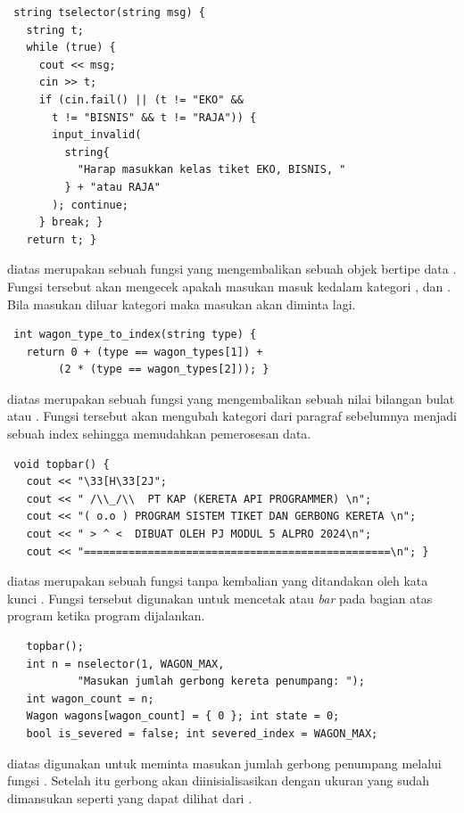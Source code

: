 \documentclass[../main.tex]{subfiles}
\begin{document}
\begin{lstlisting}
 string tselector(string msg) {
   string t;
   while (true) {
     cout << msg;
     cin >> t; 
     if (cin.fail() || (t != "EKO" &&
       t != "BISNIS" && t != "RAJA")) {
       input_invalid(
         string{
           "Harap masukkan kelas tiket EKO, BISNIS, "
         } + "atau RAJA"
       ); continue;
     } break; }
   return t; }
\end{lstlisting}
    \ilz{}{\Script} diatas merupakan sebuah fungsi yang mengembalikan sebuah objek bertipe data . Fungsi tersebut akan mengecek apakah masukan masuk kedalam kategori ,  dan . Bila masukan diluar kategori maka masukan akan diminta lagi.

\begin{lstlisting}
 int wagon_type_to_index(string type) {
   return 0 + (type == wagon_types[1]) +
        (2 * (type == wagon_types[2])); }
\end{lstlisting}
    \ilz{}{\Script} diatas merupakan sebuah fungsi yang mengembalikan sebuah nilai bilangan bulat atau . Fungsi tersebut akan mengubah kategori dari paragraf sebelumnya menjadi sebuah index sehingga memudahkan pemerosesan data.

\begin{lstlisting}
 void topbar() {
   cout << "\33[H\33[2J";
   cout << " /\\_/\\  PT KAP (KERETA API PROGRAMMER) \n";
   cout << "( o.o ) PROGRAM SISTEM TIKET DAN GERBONG KERETA \n";
   cout << " > ^ <  DIBUAT OLEH PJ MODUL 5 ALPRO 2024\n";
   cout << "================================================\n"; }
\end{lstlisting}
    \ilz{}{\Script} diatas merupakan sebuah fungsi tanpa kembalian yang ditandakan oleh kata kunci . Fungsi tersebut digunakan untuk mencetak {\header} atau \textit{bar} pada bagian atas program ketika program dijalankan.

\begin{lstlisting}
   topbar();
   int n = nselector(1, WAGON_MAX,
           "Masukan jumlah gerbong kereta penumpang: ");
   int wagon_count = n;
   Wagon wagons[wagon_count] = { 0 }; int state = 0;
   bool is_severed = false; int severed_index = WAGON_MAX;
\end{lstlisting}
    \ilz{}{\Script} diatas digunakan untuk meminta masukan jumlah gerbong penumpang melalui fungsi . Setelah itu gerbong akan diinisialisasikan dengan ukuran yang sudah dimansukan seperti yang dapat dilihat dari {\statement} .
\end{document}
